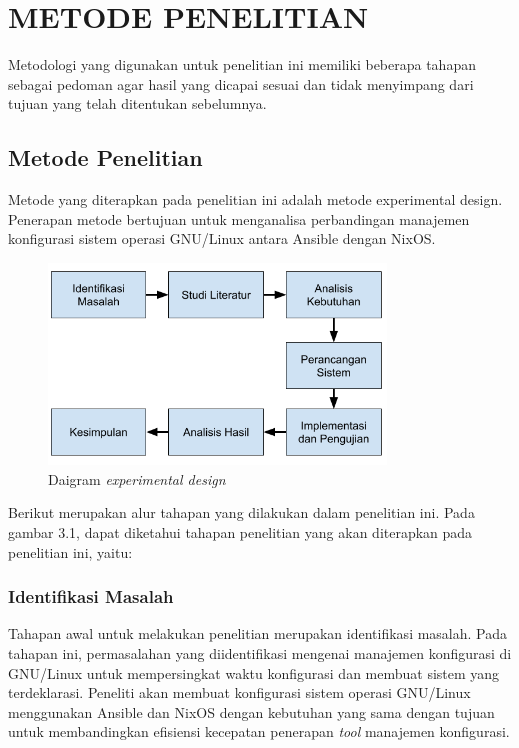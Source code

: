 \documentclass[10pt,]{report}
\begin{document}
\chapter{METODE PENELITIAN}
Metodologi yang digunakan untuk penelitian ini memiliki beberapa tahapan
sebagai pedoman agar hasil yang dicapai sesuai dan tidak menyimpang dari tujuan
yang telah ditentukan sebelumnya.\\

\section{Metode Penelitian}
\begin{adjustwidth}{20pt}{}
	\vspace{-3mm}
	\hspace\parindent
	Metode yang diterapkan pada penelitian ini adalah metode experimental design.
	Penerapan metode bertujuan untuk menganalisa perbandingan manajemen
	konfigurasi sistem operasi GNU/Linux antara Ansible dengan NixOS.

	\begin{figure}[h]
		\centering
		\includegraphics[width=0.8\textwidth]{images/metpen.png}
		\caption{Daigram \textit{experimental design}}
	\end{figure}

\end{adjustwidth}
\begin{adjustwidth}{20pt}{}
	\hspace\parindent
	Berikut merupakan alur tahapan yang dilakukan dalam penelitian ini.
	Pada gambar 3.1, dapat diketahui tahapan penelitian yang akan diterapkan
	pada penelitian ini, yaitu:
\end{adjustwidth}
\begin{adjustwidth}{20pt}{}
	\subsection{Identifikasi Masalah}
	\vspace{-3mm}
	\begin{adjustwidth}{20pt}{}
		Tahapan awal untuk melakukan penelitian merupakan identifikasi masalah. Pada
		tahapan ini, permasalahan yang diidentifikasi mengenai manajemen konfigurasi
		di GNU/Linux untuk mempersingkat waktu konfigurasi dan membuat sistem yang
		terdeklarasi. Peneliti akan membuat konfigurasi sistem operasi GNU/Linux
		menggunakan Ansible dan NixOS dengan kebutuhan yang sama dengan tujuan untuk
		membandingkan efisiensi kecepatan penerapan \textit{tool} manajemen konfigurasi.
	\end{adjustwidth}
\end{adjustwidth}
\end{document}
